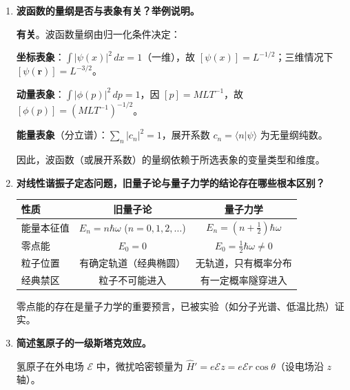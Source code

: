 \begin{enumerate}[label=\textbf{\arabic*.}, leftmargin=2em, itemsep=0.8em, resume]
\textbf{二级能量修正}：
\[
    E_n^{(2)} = \sum_{m\neq n} \frac{|H'_{mn}|^2}{E_n^{(0)} - E_m^{(0)}}
\]

\textbf{适用条件}：$|H'_{mn}/(E_n^{(0)}-E_m^{(0)})| \ll 1$（$m\neq n$），且 $E_n^{(0)}$ 为非简并能级。

\item \textbf{波函数的量纲是否与表象有关？举例说明。}

\textbf{有关}。波函数量纲由归一化条件决定：

\textbf{坐标表象}：$\int|\psi(x)|^2\,dx = 1$（一维），故 $[\psi(x)] = L^{-1/2}$；三维情况下 $[\psi(\mathbf{r})] = L^{-3/2}$。

\textbf{动量表象}：$\int|\phi(p)|^2\,dp = 1$，因 $[p] = MLT^{-1}$，故 $[\phi(p)] = (MLT^{-1})^{-1/2}$。

\textbf{能量表象}（分立谱）：$\sum_n|c_n|^2 = 1$，展开系数 $c_n = \langle n|\psi\rangle$ 为无量纲纯数。

因此，波函数（或展开系数）的量纲依赖于所选表象的变量类型和维度。

\item \textbf{对线性谐振子定态问题，旧量子论与量子力学的结论存在哪些根本区别？}

\begin{center}
\renewcommand{\arraystretch}{1.4}
\begin{tabular}{|l|c|c|}
\hline
\textbf{性质} & \textbf{旧量子论} & \textbf{量子力学} \\
\hline
能量本征值 & $E_n = n\hbar\omega$ ($n=0,1,2,\dots$) & $E_n = (n+\frac{1}{2})\hbar\omega$ \\
零点能 & $E_0 = 0$ & $E_0 = \frac{1}{2}\hbar\omega \neq 0$ \\
粒子位置 & 有确定轨道（经典椭圆） & 无轨道，只有概率分布 \\
经典禁区 & 粒子不可能进入 & 有一定概率隧穿进入 \\
\hline
\end{tabular}
\end{center}

零点能的存在是量子力学的重要预言，已被实验（如分子光谱、低温比热）证实。

\item \textbf{简述氢原子的一级斯塔克效应。}

氢原子在外电场 $\mathcal{E}$ 中，微扰哈密顿量为 $\hat{H}' = e\mathcal{E}z = e\mathcal{E}r\cos\theta$（设电场沿 $z$ 轴）。


\end{enumerate}
